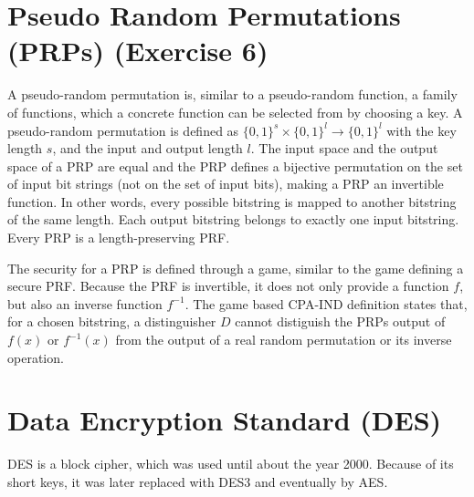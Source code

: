 \section{Pseudo Random Permutations (PRPs) (Exercise 6)}

A pseudo-random permutation is, similar to a pseudo-random function, a family of functions, which a concrete function can be selected from by choosing a key. A pseudo-random permutation is defined as $\{0,1\}^s \times \{0,1\}^l \rightarrow \{0,1\}^l$ with the key length $s$, and the input and output length $l$. The input space and the output space of a PRP are equal and the PRP defines a bijective permutation on the set of input bit strings (not on the set of input bits), making a PRP an invertible function. In other words, every possible bitstring is mapped to another bitstring of the same length. Each output bitstring belongs to exactly one input bitstring. Every PRP is a length-preserving PRF.

The security for a PRP is defined through a game, similar to the game defining a secure PRF. Because the PRF is invertible, it does not only provide a function $f$, but also an inverse function $f^{-1}$. The game based CPA-IND definition states that, for a chosen bitstring, a distinguisher $D$ cannot distiguish the PRPs output of $f(x)$ or $f^{-1}(x)$ from the output of a real random permutation or its inverse operation.

\section{Data Encryption Standard (DES)}

DES is a block cipher, which was used until about the year 2000. Because of its short keys, it was later replaced with DES3 and eventually by AES.

